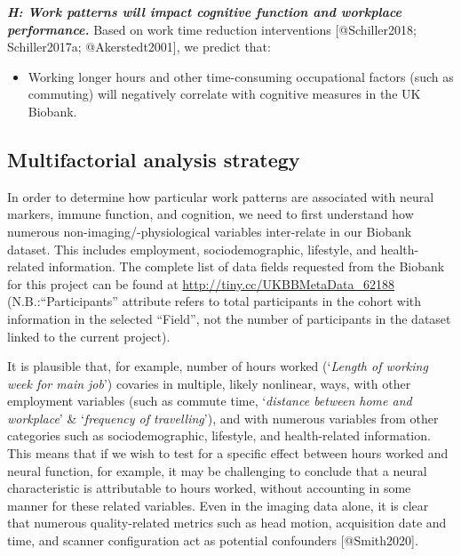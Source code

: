 \documentclass[
]{article}
\providecommand{\tightlist}{%
  \setlength{\itemsep}{0pt}\setlength{\parskip}{0pt}}
\begin{document}
\hspace{1cm}

\textbf{\emph{H: Work patterns will impact cognitive function and
workplace performance.}} Based on work time reduction interventions
{[}@Schiller2018; Schiller2017a; @Akerstedt2001{]}, we predict that:

\begin{itemize}
\tightlist
\item
  Working longer hours and other time-consuming occupational factors
  (such as commuting) will negatively correlate with cognitive measures
  in the UK Biobank.
\end{itemize}

\newpage

\hypertarget{multifactorial-analysis-strategy}{%
\subsection{Multifactorial analysis
strategy}\label{multifactorial-analysis-strategy}}

In order to determine how particular work patterns are associated with
neural markers, immune function, and cognition, we need to first
understand how numerous non-imaging/-physiological variables
inter-relate in our Biobank dataset. This includes employment,
sociodemographic, lifestyle, and health-related information. The
complete list of data fields requested from the Biobank for this project
can be found at \url{http://tiny.cc/UKBBMetaData_62188}
(N.B.:``Participants'' attribute refers to total participants in the
cohort with information in the selected ``Field'', not the number of
participants in the dataset linked to the current project).

It is plausible that, for example, number of hours worked (`\emph{Length
of working week for main job}') covaries in multiple, likely nonlinear,
ways, with other employment variables (such as commute time,
`\emph{distance between home and workplace}' \& `\emph{frequency of
travelling}'), and with numerous variables from other categories such as
sociodemographic, lifestyle, and health-related information. This means
that if we wish to test for a specific effect between hours worked and
neural function, for example, it may be challenging to conclude that a
neural characteristic is attributable to hours worked, without
accounting in some manner for these related variables. Even in the
imaging data alone, it is clear that numerous quality-related metrics
such as head motion, acquisition date and time, and scanner
configuration act as potential confounders {[}@Smith2020{]}.
\end{document}
